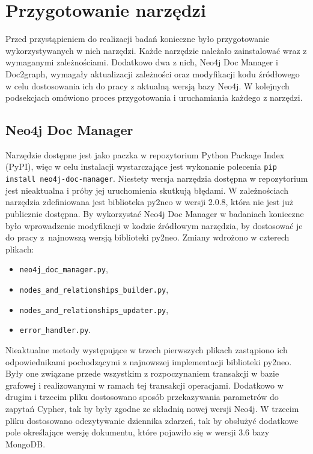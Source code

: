 \documentclass[a4paper,twoside,12pt]{book}
\begin{document}
\section{Przygotowanie narzędzi} 

Przed przystąpieniem do realizacji badań konieczne było przygotowanie wykorzystywanych w nich narzędzi. Każde narzędzie należało zainstalować wraz z wymaganymi zależnościami. Dodatkowo dwa z nich, Neo4j Doc Manager i Doc2graph, wymagały aktualizacji zależności oraz modyfikacji kodu źródłowego w celu dostosowania ich do pracy z aktualną wersją bazy Neo4j. W kolejnych podsekcjach omówiono proces przygotowania i uruchamiania każdego z narzędzi.

\subsection{Neo4j Doc Manager}

Narzędzie dostępne jest jako paczka w repozytorium Python Package Index (PyPI), więc w celu instalacji wystarczające jest wykonanie polecenia \texttt{pip install neo4j-doc-manager}. Niestety wersja narzędzia dostępna w repozytorium jest nieaktualna i próby jej uruchomienia skutkują błędami. W zależnościach narzędzia zdefiniowana jest biblioteka py2neo w wersji 2.0.8, która nie jest już publicznie dostępna. By wykorzystać Neo4j Doc Manager w badaniach konieczne było wprowadzenie modyfikacji w kodzie źródłowym narzędzia, by dostosować je do pracy z~najnowszą wersją biblioteki py2neo. Zmiany wdrożono w czterech plikach:

\begin{itemize}
\item \texttt{neo4j\_doc\_manager.py},
\item \texttt{nodes\_and\_relationships\_builder.py},
\item \texttt{nodes\_and\_relationships\_updater.py}, 
\item \texttt{error\_handler.py}.
\end{itemize}

Nieaktualne metody występujące w trzech pierwszych plikach zastąpiono ich odpowiednikami pochodzącymi z najnowszej implementacji biblioteki py2neo. Były one związane przede wszystkim z rozpoczynaniem transakcji w bazie grafowej i realizowanymi w ramach tej transakcji operacjami. Dodatkowo w drugim i trzecim pliku dostosowano sposób przekazywania parametrów do zapytań Cypher, tak by były zgodne ze składnią nowej wersji Neo4j. W trzecim pliku dostosowano odczytywanie dziennika zdarzeń, tak by obsłużyć dodatkowe pole określające wersję dokumentu, które pojawiło się w wersji 3.6 bazy MongoDB. 
\end{document}
